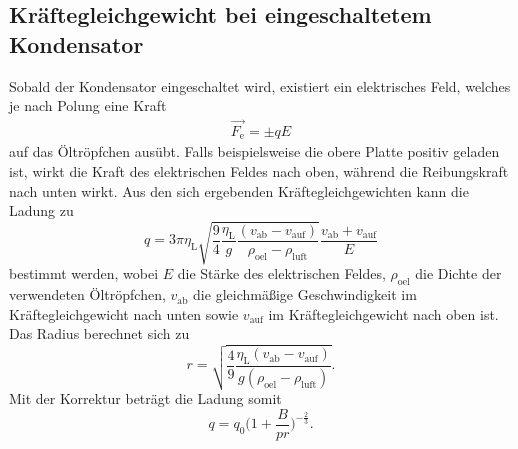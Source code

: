 \subsection{Kräftegleichgewicht bei eingeschaltetem Kondensator}
Sobald der Kondensator eingeschaltet wird, existiert ein elektrisches Feld, welches je nach Polung eine Kraft
\begin{align*}
  \vec{F_\text{e}} = \pm qE
\end{align*}
auf das Öltröpfchen ausübt.
Falls beispielsweise die obere Platte positiv geladen ist, wirkt die Kraft des elektrischen Feldes nach oben, während die Reibungskraft nach unten wirkt.
Aus den sich ergebenden Kräftegleichgewichten kann die Ladung zu
\begin{equation}
  q = 3 \pi \eta_\text{L} \sqrt{ \frac{9}{4} \frac{\eta_\text{L}}{g} \frac{ (v_\text{ab} - v_\text{auf}  )  }{\rho_\text{oel} - \rho_\text{luft}} } \frac{v_\text{ab} + v_\text{auf}}{E} \label{eqn:1}
\end{equation}
bestimmt werden, wobei $E$ die Stärke des elektrischen Feldes, $\rho_\text{oel}$ die Dichte der verwendeten Öltröpfchen, $v_\text{ab}$ die gleichmäßige Geschwindigkeit im Kräftegleichgewicht nach unten  sowie $v_\text{auf}$ im Kräftegleichgewicht nach oben ist.
Das Radius berechnet sich zu
\begin{equation}
  r = \sqrt{ \frac{4}{9} \frac{ \eta_\text{L} ( v_\text{ab} - v_\text{auf} ) }{g (\rho_\text{oel} - \rho_\text{luft}) }   }. \label{blubbr}
\end{equation}
Mit der Korrektur beträgt die Ladung somit
\begin{equation}
  q = q_0 \bigl( 1 + \frac{B}{p r}  \bigr)^{-\frac{2}{3}}. \label{blubb}
\end{equation}

